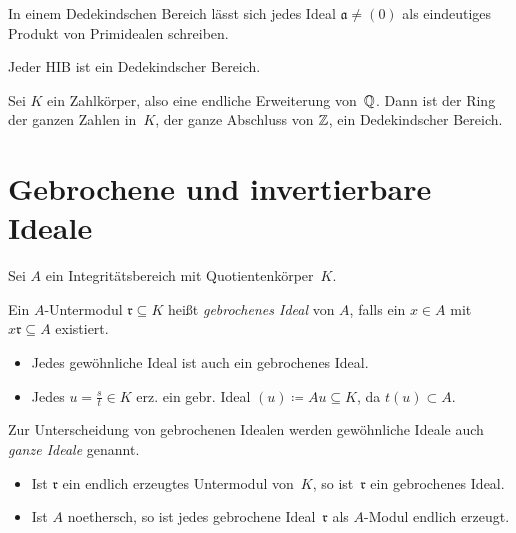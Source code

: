 \documentclass{cheat-sheet}
\newcommand{\aaa}{\mathfrak{a}}
\newcommand{\rrr}{\mathfrak{r}}
\begin{document}
\begin{kor}
  In einem Dedekindschen Bereich lässt sich jedes Ideal $\aaa \neq (0)$ als eindeutiges Produkt von Primidealen schreiben.
\end{kor}


\begin{bsp}
  Jeder HIB ist ein Dedekindscher Bereich.
\end{bsp}

\begin{satz}
  Sei $K$ ein Zahlkörper, also eine endliche Erweiterung von~$\mathbb{Q}$.
  Dann ist der Ring der ganzen Zahlen in~$K$, \dh{} der ganze Abschluss von $\mathbb{Z}$, ein Dedekindscher Bereich.
\end{satz}

\section{Gebrochene und invertierbare Ideale}


Sei $A$ ein Integritätsbereich mit Quotientenkörper~$K$.

\begin{defn}
  Ein $A$-Untermodul $\rrr \subseteq K$ heißt \emph{gebrochenes Ideal} von $A$, falls ein $x \in A$ mit $x \rrr \subseteq A$ existiert.
\end{defn}

\begin{bspe}
  \begin{itemize}
    \item Jedes gewöhnliche Ideal ist auch ein gebrochenes Ideal.
    \item Jedes $u = \tfrac{s}{t} \in K$ erz. ein gebr. Ideal $(u) \coloneqq A u \subseteq K$, da $t (u) \subset A$.
  \end{itemize}
\end{bspe}

\begin{sprechweise}
  Zur Unterscheidung von gebrochenen Idealen werden gewöhnliche Ideale auch \emph{ganze Ideale} genannt.
\end{sprechweise}

\begin{prop}
  \begin{itemize}
    \item Ist $\rrr$ ein endlich erzeugtes Untermodul von~$K$, so ist~$\rrr$ ein gebrochenes Ideal.
    \item Ist $A$ noethersch, so ist jedes gebrochene Ideal~$\rrr$ als $A$-Modul endlich erzeugt.
  \end{itemize}
\end{prop}
\end{document}
